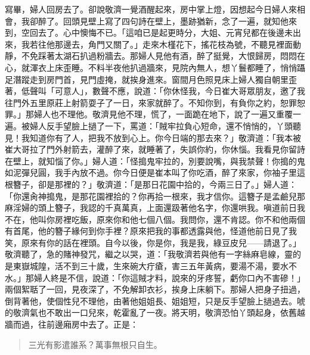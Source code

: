 寫畢，婦人回房去了。卻說敬濟一覺酒醒起來，房中掌上燈，因想起今日婦人來相會，我卻醉了。回頭見壁上寫了四句詩在壁上，墨跡猶新，念了一遍，就知他來到，空回去了。心中懊悔不已。「這咱已是起更時分，大姐、元宵兒都在後邊未出來，我若往他那邊去，角門又關了。」走來木槿花下，搖花枝為號，不聽見裡面動靜，不免踩著太湖石扒過粉牆去。那婦人見他有酒，醉了挺覺，大恨歸房，悶悶在心，就渾衣上床歪睡。不料半夜他扒過牆來，見院內無人，想丫鬟都睡了，悄悄躡足潛蹤走到房門首，見門虛掩，就挨身進來。窗間月色照見床上婦人獨自朝里歪著，低聲叫「可意人」，數聲不應，說道：「你休怪我，今日崔大哥眾朋友，邀了我往門外五里原莊上射箭耍子了一日，來家就醉了。不知你到，有負你之約，恕罪恕罪。」那婦人也不理他。敬濟見他不理，慌了，一面跪在地下，說了一遍又重覆一遍。被婦人反手望臉上撾了一下，罵道：「賊牢拉負心短命，還不悄悄的，丫頭聽見！我知道你有了人，把我不放到心上。你今日端的那去來？」敬濟道：「我本被崔大哥拉了門外射箭去，灌醉了來，就睡著了，失誤你約，你休惱。我看見你留詩在壁上，就知惱了你。」婦人道：「怪搗鬼牢拉的，別要說嘴，與我禁聲！你搗的鬼如泥彈兒圓，我手內放不過。你今日便是崔本叫了你吃酒，醉了來家，你袖子里這根簪子，卻是那裡的？」敬濟道：「是那日花園中拾的，今兩三日了。」婦人道：「你還肏神搗鬼，是那花園裡拾的？你再拾一根來，我才信你。這簪子是孟鹼兒那麻淫婦的頭上簪子，我認的千真萬真，上面還趿著他名字，你還哄我。嗔道前日我不在，他叫你房裡吃飯，原來你和他七個八個。我問你，還不肯認。你不和他兩個有首尾，他的簪子緣何到你手裡？原來把我的事都透露與他，怪道他前日見了我笑，原來有你的話在裡頭。自今以後，你是你，我是我，綠豆皮兒——請退了。」敬濟聽了，急的賭神發咒，繼之以哭，道：「我敬濟若與他有一字絲麻皂線，靈的是東嶽城隍，活不到三十歲，生來碗大疔瘡，害三五年黃病，要湯不湯，要水不水。」那婦人終是不信，說道：「你這賊才料，說來的牙疼誓，虧你口內不害磣！」兩個絮聒了一回，見夜深了，不免解卸衣衫，挨身上床躺下。那婦人把身子扭過，倒背著他，使個性兒不理他，由著他姐姐長、姐姐短，只是反手望臉上撾過去。唬的敬濟氣也不敢出一口兒來，乾霍亂了一夜。將天明，敬濟恐怕丫頭起身，依舊越牆而過，往前邊廂房中去了。正是：
\begin{quote}
三光有影遣誰系？萬事無根只自生。
\end{quote}
